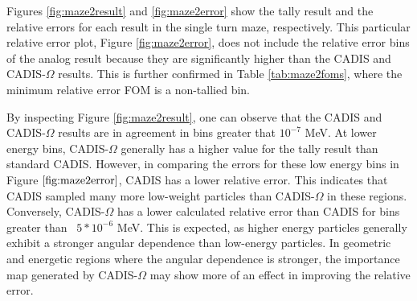 Figures \ref{fig:maze2result} and \ref{fig:maze2error} show the tally result and
the relative errors for each result in the single turn maze, respectively.
This particular relative error plot,
Figure \ref{fig:maze2error}, does not include the
relative error bins of the analog result because they are significantly higher
than the CADIS and CADIS-$\Omega$ results. This is further confirmed in Table
\ref{tab:maze2foms}, where the minimum relative error FOM is a non-tallied bin.

By inspecting Figure \ref{fig:maze2result}, one can observe that the CADIS and
CADIS-$\Omega$ results are in agreement in bins greater that $10^{-7}$ MeV. At
lower energy bins, CADIS-$\Omega$ generally has a higher value for the tally
result than standard CADIS. However, in comparing the errors for these low energy
bins in Figure $\ref{fig:maze2error}$, CADIS has a lower relative error. This
indicates that CADIS sampled many more low-weight particles than CADIS-$\Omega$
in these regions. Conversely, CADIS-$\Omega$ has a lower calculated relative
error than CADIS for bins greater than ~$5*10^{-6}$ MeV. This is expected, as
higher energy particles generally exhibit a stronger angular dependence than
low-energy particles. In geometric and energetic regions
where the angular dependence is stronger,
the importance map generated by CADIS-$\Omega$ may show more of an effect in
improving the relative error.

%
%

